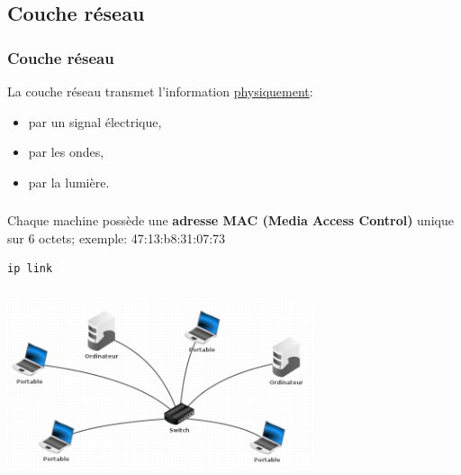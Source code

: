 \documentclass[svgnames,11pt]{beamer}
\begin{document}
\subsection{Couche réseau}
\begin{frame}
    \frametitle{Couche réseau}

    \begin{aretenir}[]
        La couche réseau transmet l'information \underline{physiquement}:
        \begin{itemize}
            \item par un signal électrique,
            \item par les ondes,
            \item par la lumière.
        \end{itemize}
        \end{aretenir}

\end{frame}
\begin{frame}[fragile]
    \frametitle{}

    \begin{aretenir}[]
    Chaque machine possède une \textbf{adresse MAC (Media Access Control)} unique sur 6 octets; exemple: 47:13:b8:31:07:73
    \end{aretenir}
\begin{center}
\begin{lstlisting}[language=Bash,basicstyle=\ttfamily\small , xleftmargin=1em, xrightmargin=1em]
ip link
\end{lstlisting}
\label{CODE}
\end{center}
\end{frame}
\begin{frame}
    \frametitle{}

    
    \begin{center}
        \centering
        \includegraphics[width=9cm]{ressources/local.png}
        \label{IMG}
        \end{center}

\end{frame}
\end{document}
